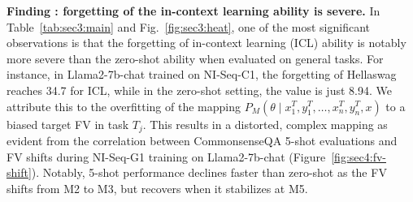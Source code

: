 \textbf{Finding \uppercase\expandafter{}: 
forgetting of the in-context learning ability is severe.} In Table~\ref{tab:sec3:main} and Fig.~\ref{fig:sec3:heat}, one of the most significant observations is that the forgetting of in-context learning (ICL) ability is notably more severe than the zero-shot ability when evaluated on general tasks. For instance, in Llama2-7b-chat trained on NI-Seq-C1, the forgetting of Hellaswag reaches 34.7 for ICL, while in the zero-shot setting, the value is just 8.94. 
We attribute this to the overfitting of the mapping \(P_M\left(\theta \mid x^T_1, y^T_1, \ldots, x_n^T, y_n^T, x\right)\) to a biased target FV in task \(T_j\). This results in a distorted, complex mapping as evident from the correlation between CommonsenseQA 5-shot evaluations and FV shifts during NI-Seq-G1 training on Llama2-7b-chat (Figure~\ref{fig:sec4:fv-shift}). Notably, 5-shot performance declines faster than zero-shot as the FV shifts from M2 to M3, but recovers when it stabilizes at M5.


